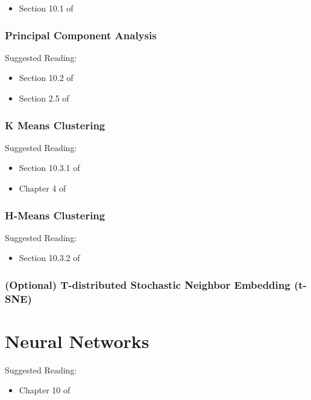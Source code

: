 \documentclass[11pt]{article}
\theoremstyle{plain}
\theoremstyle{definition}
\begin{document}
\begin{itemize}
\item Section 10.1 of \cite{ISLR}
\end{itemize}

\subsubsection{Principal Component Analysis}

Suggested Reading:
\begin{itemize}
\item Section 10.2 of \cite{ISLR}
\item Section 2.5 of \cite{wilmott}
\end{itemize}

\subsubsection{K Means Clustering}

Suggested Reading:

\begin{itemize}
\item Section 10.3.1 of \cite{ISLR}
\item Chapter 4 of \cite{wilmott}
\end{itemize}

\subsubsection{H-Means Clustering}

Suggested Reading:
\begin{itemize}
\item Section 10.3.2 of \cite{ISLR}
\end{itemize}


\subsubsection{(Optional) T-distributed Stochastic Neighbor Embedding (t-SNE)}


\newpage
\section{Neural Networks}

Suggested Reading:
\begin{itemize}
\item Chapter 10 of \cite{wilmott}
\end{itemize}
\end{document}
